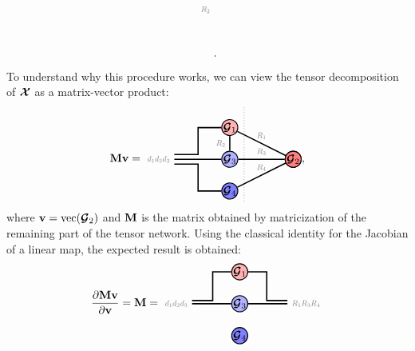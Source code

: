 \begin{itemize}
$$\begin{tikzpicture}[baseline=\baseline]
    \node[draw=none] () at (\x,\y+0.4) {\scalebox{0.7}{\dimcolor{$R_2$}}};
\end{tikzpicture}.
$$ 
To understand why this procedure works, we can view the tensor decomposition of $\Xt$ as a matrix-vector product:
$$
\Mb\vb 
=
\begin{tikzpicture}[baseline=\baseline]
    \tikzset{tensor/.style = {minimum size = 0.5cm,shape = circle,thick,draw=black,inner sep = 0pt}, edge/.style = {thick,line width=.4mm},every loop/.style={}}
    \def\y{1}
    \def\x{0}
     \node[tensor,fill=red!30!white](G_1) at (\x,\y) {$\Gt_1$};
    \node[tensor,fill=blue!30!white] (G_3) at (\x,\y-1) {$\Gt_3$};
     \node[tensor,fill=red!50!white](G_2) at (\x+2,\y-1) {$\Gt_2$};
    \node[tensor,fill=blue!50!white] (G_4) at (\x,\y-2) {$\Gt_4$};
    \node[tensor,fill=red!50!white] (G_2) at (\x+2,\y-1) {$\Gt_2$};
    \draw[edge](G_1) -- (\x-1,\y) -- (\x-1,\y-0.85) -- (\x-1.75,\y-0.85);
    \draw[edge](G_3)-- (\x-1.75,\y-1)node [left] {\scalebox{0.7}{\dimcolor{$d_1d_2d_3$}}};
    \draw[edge](G_2)--(G_1)node [midway,above] {\scalebox{0.7}{\dimcolor{$R_1$}}};
    \draw[edge](G_2)--(G_3)node [midway,above] {\scalebox{0.7}{\dimcolor{$R_3$}}};
    \draw[edge](G_1)--(G_3)node [midway,left] {\scalebox{0.7}{\dimcolor{$R_2$}}};
    \draw[edge](G_2)--(G_4)node [midway,above] {\scalebox{0.7}{\dimcolor{$R_4$}}};
    \draw[edge] (G_4) -- (\x-1,\y-2) -- (\x-1,\y-1.15) -- (\x-1.75,\y-1.15);
    \draw[dotted] (\x+0.45,\y+0.65) -- (\x+0.45,\y-2.35);
\end{tikzpicture},
$$
where $\vb = \vectorize(\Gt_2) $ and $\Mb$ is the matrix obtained by matricization of the remaining part of the tensor network. 
Using the classical identity for the Jacobian of a linear map, the expected result is obtained:
$$\frac{\partial\Mb\vb}{\partial\vb} = \Mb = 
\begin{tikzpicture}[baseline=\baseline]
    \tikzset{tensor/.style = {minimum size = 0.5cm,shape = circle,thick,draw=black,inner sep = 0pt}, edge/.style = {thick,line width=.4mm},every loop/.style={}}
    \def\y{1}
    \def\x{0}
     \node[tensor,fill=red!30!white](G_1) at (\x,\y) {$\Gt_1$};
    \node[tensor,fill=blue!30!white] (G_3) at (\x,\y-1) {$\Gt_3$};
    \node[tensor,fill=blue!50!white] (G_4) at (\x,\y-2) {$\Gt_4$};
    \draw[edge](G_1) -- (\x-0.85,\y) -- (\x-0.85,\y-0.9) -- (\x-1.5,\y-0.9);
    \draw[edge](G_3)-- (\x-1.5,\y-1)node [left] {\scalebox{0.7}{\dimcolor{$d_1d_2d_3$}}};
    \draw[edge](G_1)-- (\x+0.85,\y) -- (\x+0.85,\y-0.9) -- (\x+1.5,\y-0.9);
    \draw[edge](G_3) -- (\x+1.5,\y-1) node [right] {\scalebox{0.7}{\dimcolor{$R_1R_3R_4$}}};

\end{tikzpicture}$$
\end{itemize}
